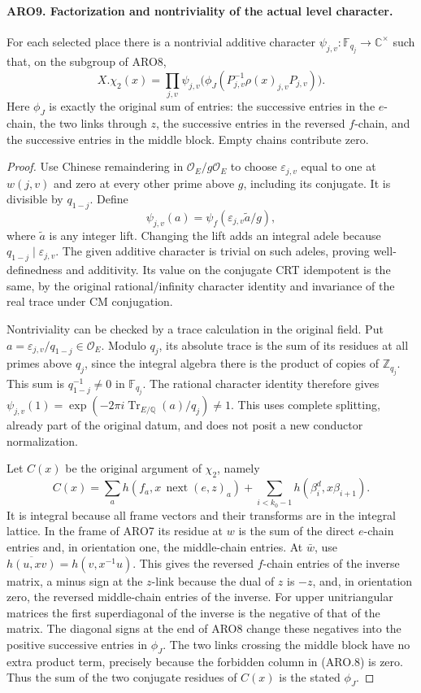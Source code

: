 \documentclass[11pt,a4paper]{article}
\numberwithin{equation}{section}
\theoremstyle{remark}\newtheorem{remark}[theorem]{Remark}
\begin{document}
\paragraph{ARO9. Factorization and nontriviality of the actual level character.}
\label{claim:ARO9}
For each selected place there is a nontrivial additive character
\(\psi_{j,v}:\mathbb F_{q_j}\to\mathbb C^\times\) such that, on
the subgroup of ARO8,
\[
 X.\chi_2(x)=\prod_{j,v}\psi_{j,v}
   \bigl(\phi_J(P_{j,v}^{-1}\rho(x)_{j,v}P_{j,v})\bigr).
 \tag{ARO.10}
\]
Here \(\phi_J\) is exactly the original sum of entries: the
successive entries in the \(e\)-chain, the two links through \(z\),
the successive entries in the reversed \(f\)-chain, and the
successive entries in the middle block.  Empty chains contribute zero.
\begin{proof}
Use Chinese remaindering in \(\mathcal O_E/g\mathcal O_E\) to
choose \(\varepsilon_{j,v}\) equal to one at \(w(j,v)\) and zero
at every other prime above \(g\), including its conjugate.
It is divisible by \(q_{1-j}\).  Define
\[
 \psi_{j,v}(a)=\psi_f(\varepsilon_{j,v}\widetilde a/g),
 \tag{ARO.11}
\]
where \(\widetilde a\) is any integer lift.  Changing the lift
adds an integral adele because \(q_{1-j}\mid\varepsilon_{j,v}\).
The given additive character is trivial on such adeles, proving
well-definedness and additivity.  Its value on the conjugate CRT
idempotent is the same, by the original rational/infinity character
identity and invariance of the real trace under CM conjugation.

Nontriviality can be checked by a trace calculation in the original
field.  Put \(a=\varepsilon_{j,v}/q_{1-j}\in\mathcal O_E\).
Modulo \(q_j\), its absolute trace is the sum of its residues at
all primes above \(q_j\), since the integral algebra there is the
product of copies of \(\mathbb Z_{q_j}\).  This sum is
\(q_{1-j}^{-1}\neq0\) in \(\mathbb F_{q_j}\).  The rational
character identity therefore gives
\(\psi_{j,v}(1)=\exp(-2\pi i\operatorname{Tr}_{E/\mathbb Q}(a)/q_j)
\neq1\).  This uses complete splitting, already part of the
original datum, and does not posit a new conductor normalization.

Let \(C(x)\) be the original argument of \(\chi_2\), namely
\[
 C(x)=\sum_a h(f_a,x\,\operatorname{next}(e,z)_a)
                 +\sum_{i<k_0-1}h(\beta_i^d,x\beta_{i+1}).
\]
It is integral because all frame vectors and their transforms are
in the integral lattice.  In the frame of ARO7 its residue at
\(w\) is the sum of the direct \(e\)-chain entries and, in
orientation one, the middle-chain entries.  At \(\bar w\), use
\(\overline{h(u,xv)}=h(v,x^{-1}u)\).  This gives the reversed
\(f\)-chain entries of the inverse matrix, a minus sign at the
\(z\)-link because the dual of \(z\) is \(-z\), and, in
orientation zero, the reversed middle-chain entries of the inverse.
For upper unitriangular matrices the first superdiagonal of the
inverse is the negative of that of the matrix.  The diagonal signs
at the end of ARO8 change these negatives into the positive
successive entries in \(\phi_J\).  The two links crossing the
middle block have no extra product term, precisely because the
forbidden column in (ARO.8) is zero.  Thus the sum of the two
conjugate residues of \(C(x)\) is the stated \(\phi_J\).


\end{proof}
\end{document}
